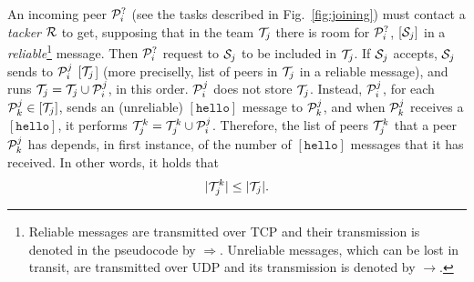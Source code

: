 \begin{figure*}
  \caption{Peer joining.\label{fig:joining}}
\end{figure*}
An incoming peer ${\cal P}^?_i$ (see the tasks described in
Fig.~\ref{fig:joining}) must contact a \emph{tacker} ${\cal R}$ to
get, supposing that in the team ${\cal T}_j$ there is room for ${\cal
  P}^?_i$, $[{\cal S}_j]$ in a \emph{reliable}\footnote{Reliable
  messages are transmitted over TCP and their transmission is denoted
  in the pseudocode by $\Rightarrow$. Unreliable messages, which can
  be lost in transit, are transmitted over UDP and its transmission is
  denoted by $\rightarrow$.} message. Then ${\cal P}^?_i$ request
to ${\cal S}_j$ to be included in ${\cal T}_j$. If ${\cal S}_j$
accepts, ${\cal S}_j$ sends to ${\cal P}^j_i$ $[{\cal T}_j$] (more
preciselly, list of peers in ${\cal T}_j$ in a reliable message), and
  runs ${\cal T}_j = {\cal T}_j \cup {\cal P}^j_i$, in this order.
  ${\cal P}^j_i$ does not store ${\cal T}_j$. Instead, ${\cal P}^j_i$,
  for each ${\cal P}^j_k\in [{\cal T}_j]$, sends an (unreliable)
  $[\mathtt{hello}]$ message to ${\cal P}^j_k$, and when ${\cal
    P}^j_k$ receives a $[\mathtt{hello}]$, it performs ${\cal T}^k_j =
  {\cal T}^k_j \cup {\cal P}^j_i$. Therefore, the list of peers ${\cal
    T}^k_j$ that a peer ${\cal P}^j_k$ has depends, in first instance,
  of the number of $[\mathtt{hello}]$ messages that it has
  received. In other words, it holds that
  \begin{equation}
    |{\cal T}^k_j| \leq |{\cal T}_j|.
  \end{equation}
  

